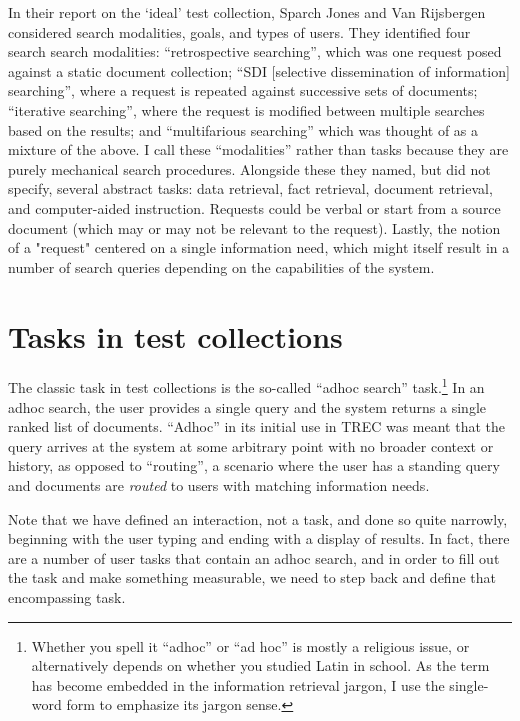 \documentclass[nobib]{tufte-book}
\begin{document}
In their report on the `ideal' test collection, Sparch Jones and Van Rijsbergen considered search modalities, goals, and types of users.  They identified four search search modalities: ``retrospective searching'', which was one request posed against a static document collection; ``SDI [selective dissemination of information] searching'', where a request is repeated against successive sets of documents; ``iterative searching'', where the request is modified between multiple searches based on the results; and ``multifarious searching'' which was thought of as a mixture of the above.\autocite{sparck_jones_report_1975}  I call these ``modalities'' rather than tasks because they are purely mechanical search procedures.  Alongside these they named, but did not specify, several abstract tasks: data retrieval, fact retrieval, document retrieval, and computer-aided instruction.  Requests could be verbal or start from a source document (which may or may not be relevant to the request).  Lastly, the notion of a "request" centered on a single information need, which might itself result in a number of search queries depending on the capabilities of the system.

\section{Tasks in test collections}

The classic task in test collections is the so-called ``adhoc search'' task.\footnote{Whether you spell it ``adhoc'' or ``ad hoc'' is mostly a religious issue, or alternatively depends on whether you studied Latin in school.  As the term has become embedded in the information retrieval jargon, I use the single-word form to emphasize its jargon sense.}  In an adhoc search, the user provides a single query and the system returns a single ranked list of documents.  ``Adhoc'' in its initial use in TREC was meant that the query arrives at the system at some arbitrary point with no broader context or history, as opposed to ``routing'', a scenario where the user has a standing query and documents are {\em routed} to users with matching information needs.

Note that we have defined an interaction, not a task, and done so quite narrowly, beginning with the user typing and ending with a display of results.  In fact, there are a number of user tasks that contain an adhoc search, and in order to fill out the task and make something measurable, we need to step back and define that encompassing task.
\end{document}
